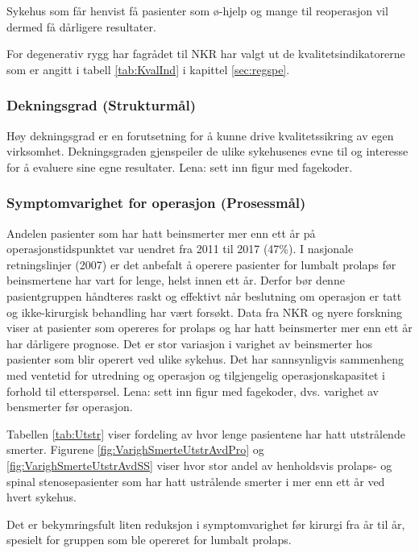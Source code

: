 \documentclass [norsk,a4paper,twoside]{article}\usepackage[]{graphicx}\usepackage[]{color}
\begin{document}
Sykehus som får henvist få pasienter som ø-hjelp og
mange til reoperasjon vil dermed få dårligere resultater. 

 



For degenerativ rygg har fagrådet til NKR har valgt ut de kvalitetsindikatorerne som er angitt i tabell \ref{tab:KvalInd}
i kapittel \ref{sec:regspe}. 

\subsubsection{Dekningsgrad (Strukturmål)}
Høy dekningsgrad er en forutsetning for å kunne drive kvalitetssikring av egen virksomhet. Dekningsgraden gjenspeiler de ulike sykehusenes evne til og interesse for å evaluere sine egne resultater.
Lena: sett inn figur med fagekoder.

\clearpage

\subsubsection{Symptomvarighet for operasjon (Prosessmål)} 

Andelen pasienter som har hatt beinsmerter mer enn ett år på
operasjonstidspunktet var uendret fra 2011 til 2017 (47\%). 
I nasjonale retningslinjer (2007) er det anbefalt å operere pasienter for lumbalt prolaps før
beinsmertene har vart for lenge, helst innen ett år. Derfor bør denne
pasientgruppen håndteres raskt og effektivt når beslutning om operasjon er tatt og
ikke-kirurgisk behandling har vært forsøkt. Data fra NKR og nyere forskning viser at
pasienter som opereres for prolaps og har hatt beinsmerter mer enn ett år har
dårligere prognose. 
Det er stor variasjon i varighet av beinsmerter hos pasienter som blir
operert ved ulike sykehus. Det har sannsynligvis sammenheng med ventetid for
utredning og operasjon og tilgjengelig operasjonskapasitet i forhold til etterspørsel.
Lena: sett inn figur med fagekoder, dvs. varighet av bensmerter før operasjon.

Tabellen  \ref{tab:Utstr} viser fordeling av hvor lenge pasientene har hatt utstrålende smerter. 
Figurene \ref{fig:VarighSmerteUtstrAvdPro} og \ref{fig:VarighSmerteUtstrAvdSS} viser hvor stor andel av henholdsvis prolaps- og spinal stenosepasienter som har hatt ustrålende smerter i mer enn ett år ved hvert sykehus.

Det er bekymringsfult liten reduksjon i symptomvarighet før kirurgi fra år til år, spesielt for gruppen som ble opereret for lumbalt prolaps.
\end{document}
